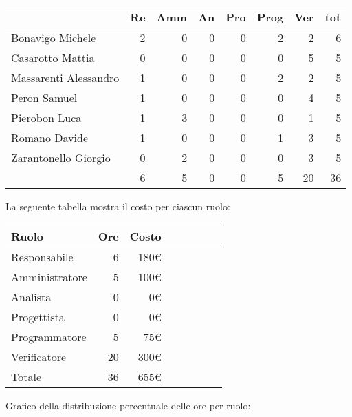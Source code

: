 \begin{table}[H]
    \begin{tabularx}{\linewidth}{X|rrrrrrr}
    \rowcolor{gray!30}& Re & Amm & An & Pro & Prog & Ver & tot \\
    \hline
    Bonavigo Michele                        & 2 & 0 & 0 & 0 & 2 & 2 & 6 \\
    \rowcolor{gray!10}Casarotto Mattia      & 0 & 0 & 0 & 0 & 0 & 5 & 5 \\
    Massarenti Alessandro                   & 1 & 0 & 0 & 0 & 2 & 2 & 5 \\
    \rowcolor{gray!10}Peron Samuel          & 1 & 0 & 0 & 0 & 0 & 4 & 5 \\
    Pierobon Luca                           & 1 & 3 & 0 & 0 & 0 & 1 & 5 \\
    \rowcolor{gray!10}Romano Davide         & 1 & 0 & 0 & 0 & 1 & 3 & 5 \\
    Zarantonello Giorgio                    & 0 & 2 & 0 & 0 & 0 & 3 & 5 \\
    \hline                                  & 6 & 5 & 0 & 0 & 5 & 20 & 36 \\ 
    \end{tabularx}
\end{table}

La seguente tabella mostra il costo per ciascun ruolo:
\begin{table}[H]
    \begin{tabularx}{\linewidth}{X|rrrrrrr}
    \rowcolor{gray!30}Ruolo & Ore & Costo \\
    \hline
    Responsabile                            & 6  & 180€ \\
    \rowcolor{gray!10}Amministratore        & 5  & 100€ \\
    Analista                                & 0  & 0€ \\
    \rowcolor{gray!10}Progettista           & 0  & 0€ \\
    Programmatore                           & 5  & 75€ \\
    \rowcolor{gray!10}Verificatore          & 20 & 300€ \\
    \hline Totale                           & 36  & 655€ \\ 
    \end{tabularx}
\end{table}

Grafico della distribuzione percentuale delle ore per ruolo:
\begin{center}
\end{center}

